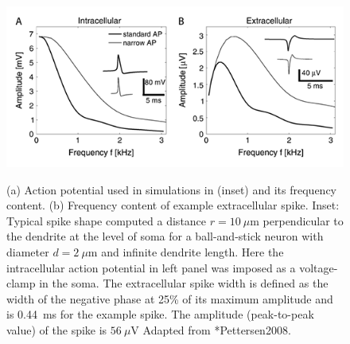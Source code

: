 \begin{figure}[!ht]
\begin{center}
\includegraphics{Figures/Spikes/Spikes-ball-and-stick-frequency-w90-r150}
\end{center}
\caption[]{(a) Action potential used in simulations in (inset) 
and its frequency content.
(b) Frequency content of example extracellular spike.
Inset: Typical spike shape computed a distance $r=10~\mu$m
perpendicular to the dendrite at the level of soma for a ball-and-stick 
neuron with diameter $d=2~\mu$m and infinite dendrite length.
Here the intracellular action potential in left panel was imposed as a voltage-clamp in the soma.
The extracellular spike width is defined as the width of the negative phase at 25\% of its maximum
amplitude and is 0.44~ms for the example spike.
The amplitude (peak-to-peak value) of the spike is $56~\mu$V  
Adapted from \citeasnoun**{Pettersen2008}.}
 
\label{fig:Spikes:ball-and-stick-frequency}
\end{figure}

%

